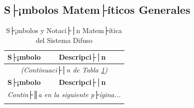 \subsection{S├¡mbolos Matem├íticos Generales}

\begin{longtable}{@{}p{3cm}p{10cm}@{}}
\caption{S├¡mbolos y Notaci├│n Matem├ítica del Sistema Difuso}
\label{tab:nomenclatura} \\
\toprule
\textbf{S├¡mbolo} & \textbf{Descripci├│n} \\
\midrule
\endfirsthead

\multicolumn{2}{c}{\textit{(Continuaci├│n de Tabla \ref{tab:nomenclatura})}} \\
\toprule
\textbf{S├¡mbolo} & \textbf{Descripci├│n} \\
\midrule
\endhead

\midrule
\multicolumn{2}{r}{\textit{Contin├║a en la siguiente p├ígina...}} \\
\endfoot


\end{longtable}
